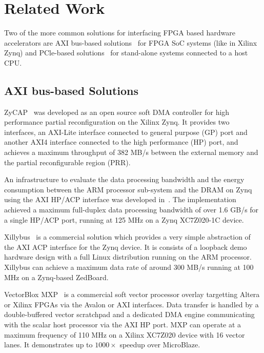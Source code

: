 \section{Related Work}
Two of the more common solutions for interfacing FPGA based hardware accelerators are AXI bus-based solutions~\cite{vipin2014zycap, sadri2013energy, xillybus2018} for FPGA SoC systems (like in Xilinx Zynq) and PCle-based solutions~\cite{xillybus2018, vipin2014dyract, gong2014efficient, de2016fflink, jacobsen2015riffa} for stand-alone systems connected to a host CPU. 

\subsection{AXI bus-based Solutions} 
ZyCAP~\cite{vipin2014zycap} was developed as an open source soft DMA controller for high performance partial reconfiguration on the Xilinx Zynq. 
It provides two interfaces, an AXI-Lite interface connected to general purpose (GP) port and another AXI4 interface connected to the high performance (HP) port, and achieves a maximum throughput of 382 MB/s between the external memory and the partial reconfigurable region (PRR). 

An infrastructure to evaluate the data processing bandwidth and the energy consumption between the ARM processor sub-system and the DRAM on Zynq using the AXI HP/ACP interface was developed in~\cite{sadri2013energy}.
The implementation achieved a maximum full-duplex data processing bandwidth of over 1.6 GB/s for a single HP/ACP port, running at 125 MHz on a Zynq XC7Z020-1C device.

Xillybus~\cite{xillybus2018} is a commercial solution which provides a very simple abstraction of the AXI ACP interface for the Zynq device. 
It is consists of a loopback demo hardware design with a full Linux distribution running on the ARM processor. 
Xillybus can achieve a maximum data rate of around 300 MB/s running at 100 MHz on a Zynq-based ZedBoard. 

VectorBlox MXP~\cite{severance2013embedded} is a commercial soft vector processor overlay targetting Altera or Xilinx FPGAs via the Avalon or AXI interfaces. 
Data transfer is handled by a double-buffered vector scratchpad and a dedicated DMA engine communicating with the scalar host processor via the AXI HP port.
MXP can operate at a maximum frequency of 110 MHz on a Xilinx XC7Z020 device with 16 vector lanes. 
It demonstrates up to $1000\times$ speedup over MicroBlaze. 

